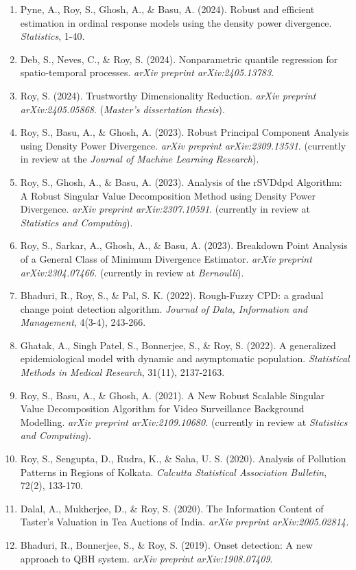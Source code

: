 \documentclass[9pt]{developercv} %
\begin{document}
\begin{minipage}{\textwidth}
    \small
    \begin{enumerate}
        \item Pyne, A., Roy, S., Ghosh, A., \& Basu, A. (2024). Robust and efficient estimation in ordinal response models using the density power divergence. \textit{Statistics}, 1-40.
        \item Deb, S., Neves, C., \& Roy, S. (2024). Nonparametric quantile regression for spatio-temporal processes. \textit{arXiv preprint arXiv:2405.13783}.
        \item Roy, S. (2024). Trustworthy Dimensionality Reduction. \textit{arXiv preprint arXiv:2405.05868}. (\textit{Master's dissertation thesis}).
        \item Roy, S., Basu, A., \& Ghosh, A. (2023). Robust Principal Component Analysis using Density Power Divergence. \textit{arXiv preprint arXiv:2309.13531}. (currently in review at the \textit{Journal of Machine Learning Research}).
        \item Roy, S., Ghosh, A., \& Basu, A. (2023). Analysis of the rSVDdpd Algorithm: A Robust Singular Value Decomposition Method using Density Power Divergence. \textit{arXiv preprint arXiv:2307.10591}. (currently in review at \textit{Statistics and Computing}).
        \item Roy, S., Sarkar, A., Ghosh, A., \& Basu, A. (2023). Breakdown Point Analysis of a General Class of Minimum Divergence Estimator. \textit{arXiv preprint arXiv:2304.07466.} (currently in review at \textit{Bernoulli}).
        \item Bhaduri, R., Roy, S., \& Pal, S. K. (2022). Rough-Fuzzy CPD: a gradual change point detection algorithm. \textit{Journal of Data, Information and Management}, 4(3-4), 243-266.
        \item Ghatak, A., Singh Patel, S., Bonnerjee, S., \& Roy, S. (2022). A generalized epidemiological model with dynamic and asymptomatic population. \textit{Statistical Methods in Medical Research}, 31(11), 2137-2163.
        \item Roy, S., Basu, A., \& Ghosh, A. (2021). A New Robust Scalable Singular Value Decomposition Algorithm for Video Surveillance Background Modelling. \textit{arXiv preprint arXiv:2109.10680.} (currently in review at \textit{Statistics and Computing}).
        \item Roy, S., Sengupta, D., Rudra, K., \& Saha, U. S. (2020). Analysis of Pollution Patterns in Regions of Kolkata. \textit{Calcutta Statistical Association Bulletin}, 72(2), 133-170.
        \item Dalal, A., Mukherjee, D., \& Roy, S. (2020). The Information Content of Taster's Valuation in Tea Auctions of India. \textit{arXiv preprint arXiv:2005.02814.}
        \item Bhaduri, R., Bonnerjee, S., \& Roy, S. (2019). Onset detection: A new approach to QBH system. \textit{arXiv preprint arXiv:1908.07409}.
    \end{enumerate}
\end{minipage}
\end{document}
